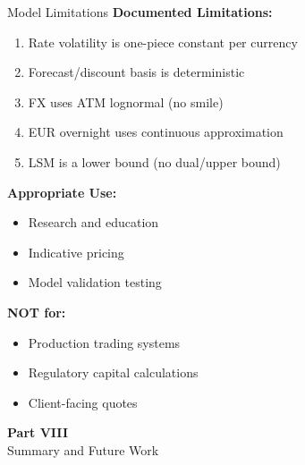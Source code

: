 \documentclass[aspectratio=169,11pt]{beamer}
\begin{document}
\begin{frame}{Model Limitations}
\textbf{Documented Limitations:}
\begin{enumerate}
    \item Rate volatility is one-piece constant per currency
    \item Forecast/discount basis is deterministic
    \item FX uses ATM lognormal (no smile)
    \item EUR overnight uses continuous approximation
    \item LSM is a lower bound (no dual/upper bound)
\end{enumerate}

\textbf{Appropriate Use:}
\begin{itemize}
    \item Research and education
    \item Indicative pricing
    \item Model validation testing
\end{itemize}

\textbf{NOT for:}
\begin{itemize}
    \item Production trading systems
    \item Regulatory capital calculations
    \item Client-facing quotes
\end{itemize}
\end{frame}


\begin{frame}{}
\begin{center}
\Huge\textbf{Part VIII}\\[1cm]
\Large Summary and Future Work
\end{center}
\end{frame}
\end{document}
